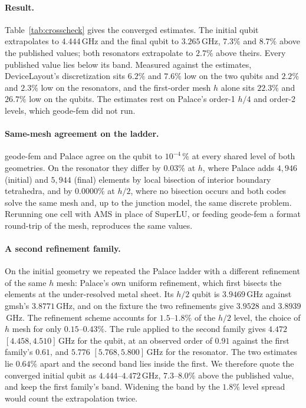 \documentclass{anvil-paper}
\begin{document}
\paragraph{Result.}
Table~\ref{tab:crosscheck} gives the converged estimates. The initial
qubit extrapolates to $4.444$\,GHz and the final qubit to $3.265$\,GHz,
$7.3\%$ and $8.7\%$ above the published values; both resonators
extrapolate to $2.7\%$ above theirs. Every published value lies below its
band. Measured against the estimates, DeviceLayout's discretization sits
$6.2\%$ and $7.6\%$ low on the two qubits and $2.2\%$ and $2.3\%$ low on
the resonators, and the first-order mesh $h$ alone sits $22.3\%$ and
$26.7\%$ low on the qubits. The estimates rest on Palace's order-1 $h/4$
and order-2 levels, which geode-fem did not run.

\paragraph{Same-mesh agreement on the ladder.}
geode-fem and Palace agree on the qubit to $10^{-4}\,\%$ at every shared
level of both geometries. On the resonator they differ by $0.03\%$ at
$h$, where Palace adds $4{,}946$ (initial) and $5{,}944$ (final) elements
by local bisection of interior boundary tetrahedra, and by $0.0000\%$ at
$h/2$, where no bisection occurs and both codes solve the same mesh and, up
to the junction model, the same discrete problem. Rerunning one cell with
AMS in place of SuperLU, or feeding geode-fem a format round-trip of the
mesh, reproduces the same values.

\paragraph{A second refinement family.}
On the initial geometry we repeated the Palace ladder with a different
refinement of the same $h$ mesh: Palace's own uniform refinement, which
first bisects the elements at the under-resolved metal sheet. Its $h/2$
qubit is $3.9469$\,GHz against gmsh's $3.8771$\,GHz, and on the fixture the
two refinements give $3.9528$ and $3.8939$\,GHz. The refinement scheme
accounts for $1.5$--$1.8\%$ of the $h/2$ level, the choice of $h$ mesh for
only $0.15$--$0.43\%$. The rule applied to the second family gives
$4.472$ $[4.458, 4.510]$\,GHz for the qubit, at an observed order of $0.91$
against the first family's $0.61$, and $5.776$ $[5.768, 5.800]$\,GHz for the
resonator. The two estimates lie $0.64\%$ apart and the second band lies
inside the first. We therefore quote the converged initial qubit as
$4.444$--$4.472$\,GHz, $7.3$--$8.0\%$ above the published value, and keep
the first family's band. Widening the band by the $1.8\%$ level spread
would count the extrapolation twice.
\end{document}
